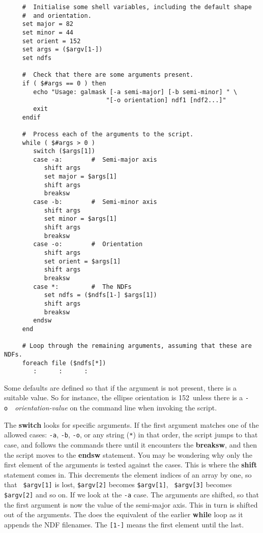 \small
\begin{verbatim}
     #  Initialise some shell variables, including the default shape
     #  and orientation.
     set major = 82
     set minor = 44
     set orient = 152
     set args = ($argv[1-])
     set ndfs

     #  Check that there are some arguments present.
     if ( $#args == 0 ) then
        echo "Usage: galmask [-a semi-major] [-b semi-minor] " \
                            "[-o orientation] ndf1 [ndf2...]"
        exit
     endif

     #  Process each of the arguments to the script.
     while ( $#args > 0 )
        switch ($args[1])
        case -a:        #  Semi-major axis
           shift args
           set major = $args[1]
           shift args
           breaksw
        case -b:        #  Semi-minor axis
           shift args
           set minor = $args[1]
           shift args
           breaksw
        case -o:        #  Orientation
           shift args
           set orient = $args[1]
           shift args
           breaksw
        case *:         #  The NDFs
           set ndfs = ($ndfs[1-] $args[1])
           shift args
           breaksw
        endsw
     end

     # Loop through the remaining arguments, assuming that these are NDFs.
     foreach file ($ndfs[*])
        :      :      :
\end{verbatim}
\normalsize
Some defaults are defined so that if the argument is not present,
there is a suitable value.  So for instance, the ellipse orientation
is 152\dgs\ unless there is a \mbox{{\tt -o} {\em
orientation-value\/}} on the command line when invoking the script.

The {\bf switch} looks for specific arguments.  If the first argument
matches one of the allowed cases: {\tt -a}, {\tt -b}, {\tt -o}, or any
string ({\tt{*}}) in that order, the script jumps to that case, and
follows the commands there until it encounters the {\bf breaksw}, and
then the script moves to the {\bf endsw} statement.  You may be
wondering why only the first element of the arguments is tested against
the cases.  This is where the {\bf shift} statement comes in.  This
decrements the element indices of an array by one, so that {\tt
\$argv[1]} is lost, {\tt \$argv[2]} becomes {\tt \$argv[1]}, {\tt
\$argv[3]} becomes {\tt \$argv[2]} and so on.  If we look at the
{\tt -a} case.  The arguments are shifted, so that the first argument
is now the value of the semi-major axis.  This in turn is shifted out
of the arguments.  The \htmlref{{\tt *} case}{sc4_se_arguments} does
the equivalent of the earlier {\bf while} loop  as it appends the NDF filenames.  The
{\tt [1-]} means the first element until the last.

